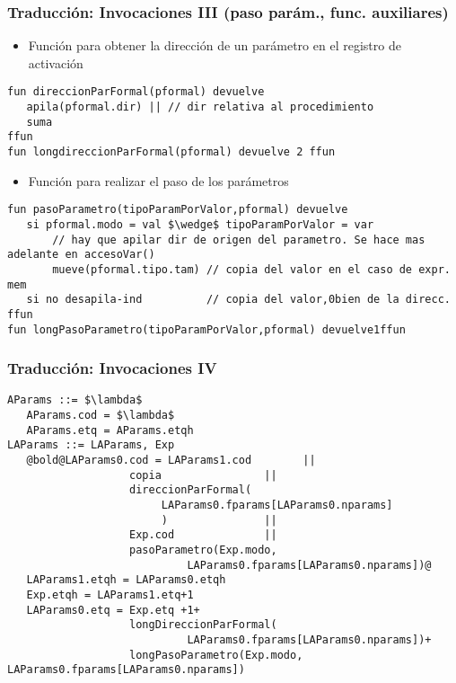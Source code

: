 \documentclass[hyperref={pdfpagelabels=false},tree-dvips,compress]{beamer}
\begin{document}
\begin{frame}[fragile]
\frametitle{Traducción: Invocaciones III (paso parám., func. auxiliares)}

\begin{itemize}
	\item Función para obtener la dirección de un parámetro en el registro de activación
\end{itemize}

\begin{lstlisting}[style=codigoMP,basicstyle=\scriptsize\ttfamily,mathescape]
fun direccionParFormal(pformal) devuelve
   apila(pformal.dir) || // dir relativa al procedimiento
   suma
ffun
fun longdireccionParFormal(pformal) devuelve 2 ffun
\end{lstlisting}

\begin{itemize}
	\item Función para realizar el paso de los parámetros
\end{itemize}

\begin{lstlisting}[style=codigoMP,basicstyle=\scriptsize\ttfamily,mathescape]
fun pasoParametro(tipoParamPorValor,pformal) devuelve
   si pformal.modo = val $\wedge$ tipoParamPorValor = var
       // hay que apilar dir de origen del parametro. Se hace mas adelante en accesoVar()
       mueve(pformal.tipo.tam) // copia del valor en el caso de expr. mem
   si no desapila-ind          // copia del valor,0bien de la direcc.
ffun
fun longPasoParametro(tipoParamPorValor,pformal) devuelve1ffun
\end{lstlisting}

\end{frame}
\begin{frame}[fragile]
\frametitle{Traducción: Invocaciones IV}

\begin{lstlisting}[style=gramaticas,basicstyle=\scriptsize\ttfamily,mathescape]
AParams ::= $\lambda$
   AParams.cod = $\lambda$
   AParams.etq = AParams.etqh
LAParams ::= LAParams, Exp
   @bold@LAParams0.cod = LAParams1.cod        ||
                   copia                ||
                   direccionParFormal(
                   	    LAParams0.fparams[LAParams0.nparams]
                   	    )               ||
                   Exp.cod              ||
                   pasoParametro(Exp.modo,
                            LAParams0.fparams[LAParams0.nparams])@
   LAParams1.etqh = LAParams0.etqh
   Exp.etqh = LAParams1.etq+1
   LAParams0.etq = Exp.etq +1+
                   longDireccionParFormal(
                   	        LAParams0.fparams[LAParams0.nparams])+
                   longPasoParametro(Exp.modo, LAParams0.fparams[LAParams0.nparams])
\end{lstlisting}

\end{frame}
\end{document}
